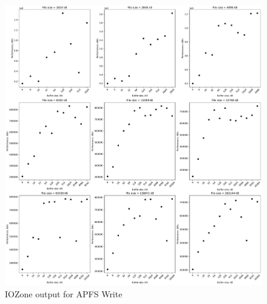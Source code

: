 \begin{figure}[!htb]
	\label{fig:bench_apfs_write}
	\begin{center}
		\includegraphics[width=1.0\textwidth]{figures/benchmarking/local/Write.pdf}
	\end{center}
	\caption{IOZone output for \gls{APFS} Write}
\end{figure}

